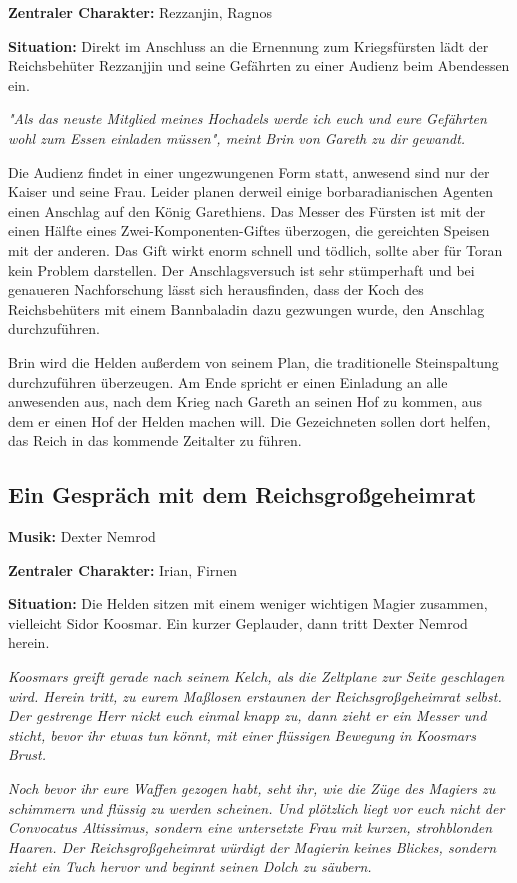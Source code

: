 \textbf{Zentraler Charakter:} Rezzanjin, Ragnos 

\textbf{Situation:} Direkt im Anschluss an die Ernennung zum Kriegsfürsten lädt der Reichsbehüter Rezzanjjin und seine Gefährten zu einer Audienz beim Abendessen ein.

\emph{"Als das neuste Mitglied meines Hochadels werde ich euch und eure Gefährten wohl zum Essen einladen müssen", meint Brin von Gareth zu dir gewandt.}

Die Audienz findet in einer ungezwungenen Form statt, anwesend sind nur der Kaiser und seine Frau. Leider planen derweil einige borbaradianischen Agenten einen Anschlag auf den König Garethiens. Das Messer des Fürsten ist mit der einen Hälfte eines Zwei-Komponenten-Giftes überzogen, die gereichten Speisen mit der anderen. Das Gift wirkt enorm schnell und tödlich, sollte aber für Toran kein Problem darstellen. Der Anschlagsversuch ist sehr stümperhaft und bei genaueren Nachforschung lässt sich herausfinden, dass der Koch des Reichsbehüters mit einem Bannbaladin dazu gezwungen wurde, den Anschlag durchzuführen.

Brin wird die Helden außerdem von seinem Plan, die traditionelle Steinspaltung durchzuführen überzeugen. Am Ende spricht er einen Einladung an alle anwesenden aus, nach dem Krieg nach Gareth an seinen Hof zu kommen, aus dem er einen Hof der Helden machen will. Die Gezeichneten sollen dort helfen, das Reich in das kommende Zeitalter zu führen.

\subsection{Ein Gespräch mit dem Reichsgroßgeheimrat}
\textbf{Musik:} Dexter Nemrod

\textbf{Zentraler Charakter:} Irian, Firnen 

\textbf{Situation:} Die Helden sitzen mit einem weniger wichtigen Magier zusammen, vielleicht Sidor Koosmar. Ein kurzer Geplauder, dann tritt Dexter Nemrod herein.

\emph{Koosmars greift gerade nach seinem Kelch, als die Zeltplane zur Seite geschlagen wird. Herein tritt, zu eurem Maßlosen erstaunen der Reichsgroßgeheimrat selbst. Der gestrenge Herr nickt euch einmal knapp zu, dann zieht er ein Messer und sticht, bevor ihr etwas tun könnt, mit einer flüssigen Bewegung in Koosmars Brust.}

\emph{Noch bevor ihr eure Waffen gezogen habt, seht ihr, wie die Züge des Magiers zu schimmern und flüssig zu werden scheinen. Und plötzlich liegt vor euch nicht der Convocatus Altissimus, sondern eine untersetzte Frau mit kurzen, strohblonden Haaren. Der Reichsgroßgeheimrat würdigt der Magierin keines Blickes, sondern zieht ein Tuch hervor und beginnt seinen Dolch zu säubern.}


